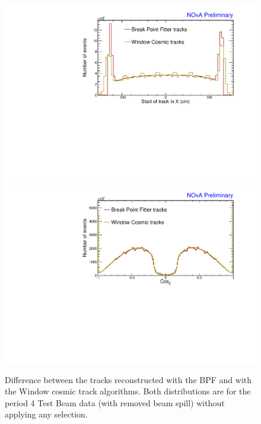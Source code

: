 \begin{enumerate}
\begin{enumerate}
\begin{figure}[!ht]
\includegraphics[width=\textwidth]{Plots/TBCalibration/DBSim_TrackAlgComparison_StartX.pdf}
\includegraphics[width=\textwidth]{Plots/TBCalibration/DBSim_TrackAlgComparison_CosZ.pdf}
\caption[Tracking algorithms for the data-based simulation selection]{Difference between the tracks reconstructed with the \acrshort{BPF} and with the Window cosmic track algorithms. Both distributions are for the period 4 Test Beam data (with removed beam spill) without applying any selection.}
\label{fig:DataBasedSimTrackComparison}
\end{figure}


\end{enumerate}
\end{enumerate}
